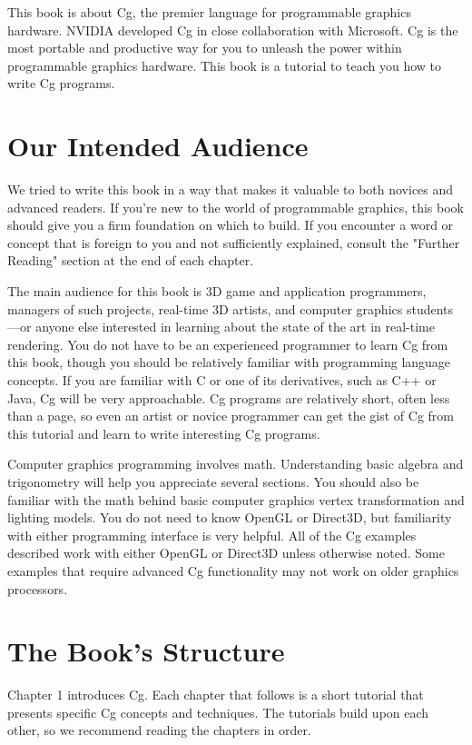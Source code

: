\documentclass{book}
\begin{document}
This book is about Cg, the premier language for programmable graphics hardware. NVIDIA developed Cg in close collaboration with Microsoft. Cg is the most portable and productive way for you to unleash the power within programmable graphics hardware. This book is a tutorial to teach you how to write Cg programs.

\section*{Our Intended Audience}

We tried to write this book in a way that makes it valuable to both novices and advanced readers. If you're new to the world of programmable graphics, this book should give you a firm foundation on which to build. If you encounter a word or concept that is foreign to you and not sufficiently explained, consult the "Further Reading" section at the end of each chapter.

The main audience for this book is 3D game and application programmers, managers of such projects, real-time 3D artists, and computer graphics students—or anyone else interested in learning about the state of the art in real-time rendering. You do not have to be an experienced programmer to learn Cg from this book, though you should be relatively familiar with programming language concepts. If you are familiar with C or one of its derivatives, such as C++ or Java, Cg will be very approachable. Cg programs are relatively short, often less than a page, so even an artist or novice programmer can get the gist of Cg from this tutorial and learn to write interesting Cg programs.

Computer graphics programming involves math. Understanding basic algebra and trigonometry will help you appreciate several sections. You should also be familiar with the math behind basic computer graphics vertex transformation and lighting models. You do not need to know OpenGL or Direct3D, but familiarity with either programming interface is very helpful. All of the Cg examples described work with either OpenGL or Direct3D unless otherwise noted. Some examples that require advanced Cg functionality may not work on older graphics processors.

\section*{The Book's Structure}

Chapter 1 introduces Cg. Each chapter that follows is a short tutorial that presents specific Cg concepts and techniques. The tutorials build upon each other, so we recommend reading the chapters in order.
\end{document}
